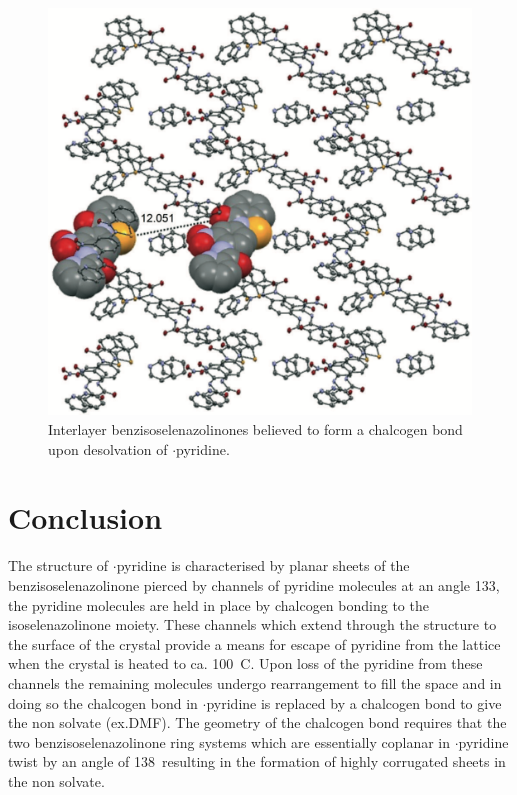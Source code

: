 \begin{refsection}
    \begin{figure}
        \centering
        \includegraphics[width=0.8\linewidth]{Figures/ebs-nitroamide-2py-transformation.pdf}
        \caption[Rearrangement of Ch-bonds upon desolvation.]{Interlayer benzisoselenazolinones  believed to form a  chalcogen bond upon desolvation of $\cdot$pyridine.}\label{fig:ebs-nitroamide-2py-transformation}
    \end{figure}
    
    \section{Conclusion}
    The structure of $\cdot$pyridine is characterised by planar sheets of the benzisoselenazolinone  pierced by channels of pyridine molecules at an angle 133\degree, the pyridine molecules are held in place by  chalcogen bonding to the isoselenazolinone moiety.
    These channels which extend through the structure to the surface of the crystal provide a means for escape of pyridine from the lattice when the crystal is heated to ca. 100~\degree{}C.
    Upon loss of the pyridine from these channels the remaining molecules undergo rearrangement to fill the space and in doing so the  chalcogen bond in $\cdot$pyridine is replaced by a  chalcogen bond to give the non solvate (ex.DMF).
    The geometry of the chalcogen bond requires that the two benzisoselenazolinone ring systems which are essentially coplanar in $\cdot$pyridine twist by an angle of 138\degree~resulting in the formation of highly corrugated sheets in the non solvate.
    

\end{refsection}
